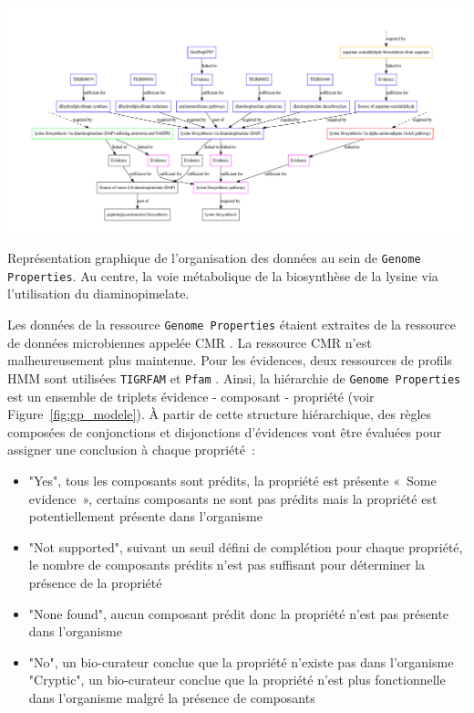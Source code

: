 \begin{refsegment}
    \begin{shadedfigure}[H]
        \centering
        \includegraphics[width=\textwidth]{img/lysine_biosynthesis.pdf}
        \caption{ Représentation graphique de l'organisation des données au sein de \texttt{Genome Properties}. Au centre, la voie métabolique de la biosynthèse de la lysine via l'utilisation du diaminopimelate. }
        \label{fig:gp_lysine}
    \end{shadedfigure}

    Les données de  la ressource \texttt{Genome Properties} étaient extraites de la ressource de données microbiennes appelée \gls{CMR} \cite{peterson2001comprehensive,davidsen2009comprehensive}. La ressource \gls{CMR} n'est malheureusement plus maintenue. Pour les évidences, deux ressources de profils \gls{HMM} sont utilisées \texttt{TIGRFAM} \cite{haft2003tigrfams}\label{key} et \texttt{Pfam} \cite{bateman2000pfam,bateman2002pfam,bateman2004pfam,finn2008pfam,finn2009pfam,punta2011pfam,finn2013pfam,finn2016pfam}. Ainsi, la hiérarchie de \texttt{Genome Properties} est un ensemble de triplets évidence - composant - propriété (voir Figure~\cref{fig:gp_modele}). À partir de cette structure hiérarchique, des règles composées de conjonctions et disjonctions d'évidences vont être évaluées pour assigner une conclusion à chaque propriété :
    \begin{itemize}
        \item "Yes", tous les composants sont prédits, la propriété est présente
        « Some evidence », certains composants ne sont pas prédits mais la propriété est potentiellement présente dans l'organisme
        \item "Not supported", suivant un seuil défini de complétion pour chaque propriété, le nombre de composants prédits n'est pas suffisant pour déterminer la présence de la propriété
        \item "None found", aucun composant prédit donc la propriété n'est pas présente dans l'organisme
        \item "No", un bio-curateur conclue que la propriété n'existe pas dans l'organisme
        "Cryptic", un bio-curateur conclue que la propriété n'est plus fonctionnelle dans l'organisme malgré la présence de composants
    \end{itemize}
    

\end{refsegment}
